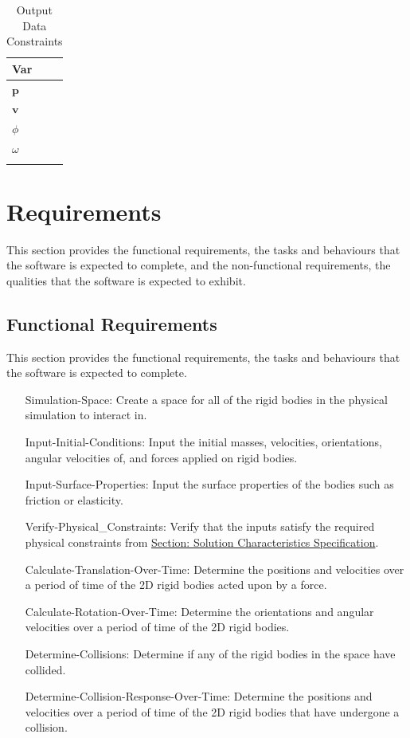 \documentclass[12pt]{article}
\begin{document}
\begin{longtable}{l}
\toprule
\textbf{Var}
\\
\midrule
\endhead
$\mathbf{p}$
\\
$\mathbf{v}$
\\
$ϕ$
\\
$ω$
\\
\bottomrule
\caption{Output Data Constraints}
\label{Table:OutDataConstraints}
\end{longtable}
\section{Requirements}
\label{Sec:Requirements}
This section provides the functional requirements, the tasks and behaviours that the software is expected to complete, and the non-functional requirements, the qualities that the software is expected to exhibit.

\subsection{Functional Requirements}
\label{Sec:FRs}
This section provides the functional requirements, the tasks and behaviours that the software is expected to complete.

\begin{itemize}
\item[Simulation-Space:\phantomsection\label{simSpace}]{Create a space for all of the rigid bodies in the physical simulation to interact in.}
\item[Input-Initial-Conditions:\phantomsection\label{inputInitialConds}]{Input the initial masses, velocities, orientations, angular velocities of, and forces applied on rigid bodies.}
\item[Input-Surface-Properties:\phantomsection\label{inputSurfaceProps}]{Input the surface properties of the bodies such as friction or elasticity.}
\item[Verify-Physical\_Constraints:\phantomsection\label{verifyPhysCons}]{Verify that the inputs satisfy the required physical constraints from \hyperref[Sec:SolCharSpec]{Section: Solution Characteristics Specification}.}
\item[Calculate-Translation-Over-Time:\phantomsection\label{calcTransOverTime}]{Determine the positions and velocities over a period of time of the 2D rigid bodies acted upon by a force.}
\item[Calculate-Rotation-Over-Time:\phantomsection\label{calcRotOverTime}]{Determine the orientations and angular velocities over a period of time of the 2D rigid bodies.}
\item[Determine-Collisions:\phantomsection\label{deterColls}]{Determine if any of the rigid bodies in the space have collided.}
\item[Determine-Collision-Response-Over-Time:\phantomsection\label{deterCollRespOverTime}]{Determine the positions and velocities over a period of time of the 2D rigid bodies that have undergone a collision.}
\end{itemize}
\end{document}
